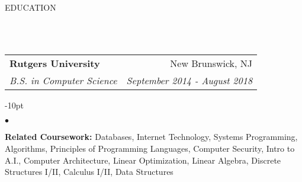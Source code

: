 \documentclass[12pt]{article}
\makeatletter
\newcommand{\header}[1]{
	\vspace*{12pt} %
	{\hspace*{-14pt}\vspace*{6pt} #1}
	\vspace*{-6pt} 
	\lineunder
}
\newcommand{\lineunder}{
	\vspace*{-8pt} \\ 
	\hspace*{-18pt} 
	\hrulefill \\
}
\newcommand{\subheading}[4]{
 	\vspace{5pt}
    	\begin{tabular*}{1.01\textwidth}
    		{l@{\extracolsep{\fill}}r}
      		\hspace{-16pt}\textbf{#1} & #2 \\
      		\hspace{-16pt}\textit{\small#3} & \textit{\small #4} \\
    	\end{tabular*}
    \vspace{-4pt}
}
\newenvironment{achievements}{
\begin{adjustwidth}{-10pt}{}
  \begin{list}{$\bullet$}{
  	\topsep 0pt \itemsep -4pt}}
  	{\vspace*{2pt}\end{list}
\end{adjustwidth}
}
\makeatother
\begin{document}
\vspace{-8pt}
\header{EDUCATION}

\subheading
	{Rutgers University}{New Brunswick, NJ}
	{B.S. in Computer Science}{September 2014 - August 2018}
	\begin{achievements}	
	\item{\bf Related Coursework:} Databases, Internet Technology, Systems Programming, Algorithms, Principles of Programming Languages, Computer Security, Intro to A.I., Computer Architecture, Linear Optimization,   Linear Algebra, Discrete Structures I/II, Calculus I/II, Data Structures
	\end{achievements}


	
\end{document}
